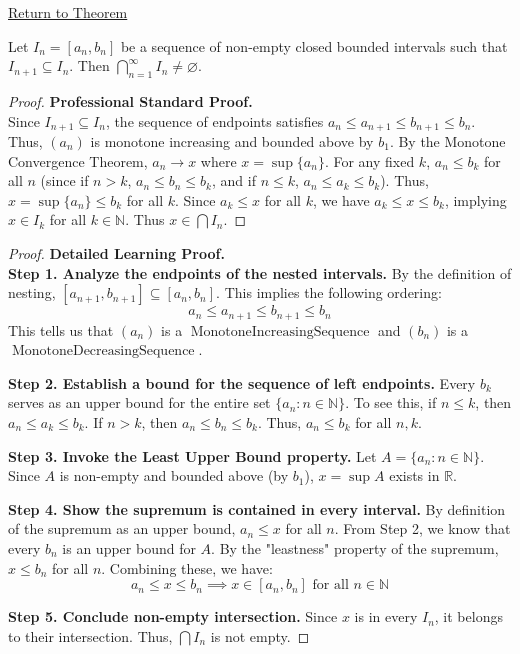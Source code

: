 \newpage
{}
\label{prf:nested-interval-theorem}

\begin{remark*}[Return]
\hyperref[thm:nested-interval-theorem]{Return to Theorem}
\end{remark*}

\begin{theorem*}
Let $I_n = [a_n, b_n]$ be a sequence of non-empty closed bounded intervals such that $I_{n+1} \subseteq I_n$. Then $\bigcap_{n=1}^\infty I_n \neq \varnothing$.
\end{theorem*}

\begin{proof}
\textbf{Professional Standard Proof.}~\\
Since $I_{n+1} \subseteq I_n$, the sequence of endpoints satisfies $a_n \le a_{n+1} \le b_{n+1} \le b_n$. Thus, $(a_n)$ is monotone increasing and bounded above by $b_1$. By the Monotone Convergence Theorem, $a_n \to x$ where $x = \sup \{a_n\}$. For any fixed $k$, $a_n \le b_k$ for all $n$ (since if $n > k$, $a_n \le b_n \le b_k$, and if $n \le k$, $a_n \le a_k \le b_k$). Thus, $x = \sup \{a_n\} \le b_k$ for all $k$. Since $a_k \le x$ for all $k$, we have $a_k \le x \le b_k$, implying $x \in I_k$ for all $k \in \mathbb{N}$. Thus $x \in \bigcap I_n$.
\end{proof}

\begin{proof}
\textbf{Detailed Learning Proof.}~\\

\textbf{Step 1. Analyze the endpoints of the nested intervals.}
By the definition of nesting, $[a_{n+1}, b_{n+1}] \subseteq [a_n, b_n]$. This implies the following ordering:
\[ a_n \le a_{n+1} \le b_{n+1} \le b_n \]
This tells us that $(a_n)$ is a $\operatorname{MonotoneIncreasingSequence}$ and $(b_n)$ is a $\operatorname{MonotoneDecreasingSequence}$.

\textbf{Step 2. Establish a bound for the sequence of left endpoints.}
Every $b_k$ serves as an upper bound for the entire set $\{a_n : n \in \mathbb{N}\}$. To see this, if $n \le k$, then $a_n \le a_k \le b_k$. If $n > k$, then $a_n \le b_n \le b_k$. Thus, $a_n \le b_k$ for all $n, k$.

\textbf{Step 3. Invoke the Least Upper Bound property.}
Let $A = \{a_n : n \in \mathbb{N}\}$. Since $A$ is non-empty and bounded above (by $b_1$), $x = \sup A$ exists in $\mathbb{R}$. 

\textbf{Step 4. Show the supremum is contained in every interval.}
By definition of the supremum as an upper bound, $a_n \le x$ for all $n$.
From Step 2, we know that every $b_n$ is an upper bound for $A$. By the "leastness" property of the supremum, $x \le b_n$ for all $n$.
Combining these, we have:
\[ a_n \le x \le b_n \implies x \in [a_n, b_n] \text{ for all } n \in \mathbb{N} \]

\textbf{Step 5. Conclude non-empty intersection.}
Since $x$ is in every $I_n$, it belongs to their intersection. Thus, $\bigcap I_n$ is not empty.
\end{proof}

